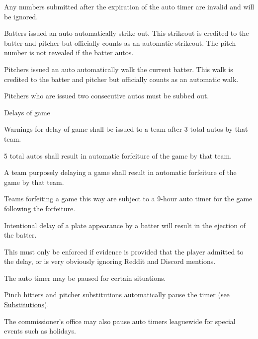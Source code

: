 \begin{deepEnumerate}
\begin{deepEnumerate}
		\begin{deepEnumerate}
			\item Any numbers submitted after the expiration of the auto timer are invalid and will be ignored.
			\item Batters issued an auto automatically strike out. This strikeout is credited to the batter and pitcher but officially counts as an automatic strikeout.
			The pitch number is not revealed if the batter autos.
			\item Pitchers issued an auto automatically walk the current batter. This walk is credited to the batter and pitcher but officially counts as an automatic walk.
		\end{deepEnumerate}
		\item Pitchers who are issued two consecutive autos must be subbed out.
		\item Delays of game
		\begin{deepEnumerate}
			\item Warnings for delay of game shall be issued to a team after 3 total autos by that team.
			\item 5 total autos shall result in automatic forfeiture of the game by that team.
			\item A team purposely delaying a game shall result in automatic forfeiture of the game by that team.
			\begin{deepEnumerate}
				\item Teams forfeiting a game this way are subject to a 9-hour auto timer for the game following the forfeiture.
			\end{deepEnumerate}
			\item Intentional delay of a plate appearance by a batter will result in the ejection of the batter.
			\begin{deepEnumerate}
				\item This must only be enforced if evidence is provided that the player admitted to the delay, 
				or is very obviously ignoring Reddit and Discord mentions.
			\end{deepEnumerate}
		\end{deepEnumerate}
		\item The auto timer may be paused for certain situations.
		\begin{deepEnumerate}
			\item Pinch hitters and pitcher substitutions automatically pause the timer (see \hyperref[sec:substitutions]{Substitutions}).
			\item The commissioner's office may also pause auto timers leaguewide for special events such as holidays. 

\end{deepEnumerate}
\end{deepEnumerate}
\end{deepEnumerate}
